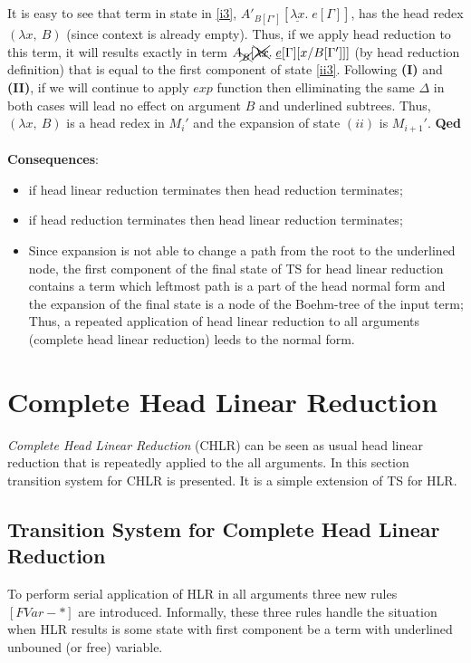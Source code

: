 \documentclass[a4paper, 10pt]{article}
\begin{document}
It is easy to see that term in state in \eqref{i3}, $A'_{B[\Gamma']}[\underline{\lambda x}.\; e[\Gamma]]$, has the head redex $(\lambda x,\ B)$ (since context is already empty). Thus, if we apply head reduction to this term, it will results exactly in term $A_{\xcancel{B}}[\xcancel{\lambda x}.\; \underline{e}[\Gamma][x/B[\Gamma']]]$ (by head reduction definition) that is equal to the first component of state \eqref{ii3}. Following \textbf{(I)} and \textbf{(II)}, if we will continue to apply $exp$ function then elliminating the same $\Delta$ in both cases will lead no effect on argument $B$ and underlined subtrees. Thus, $(\lambda x,\ B)$ is a head redex in $M_i'$ and the expansion of state $(ii)$ is $M_{i+1}'$. \hfill{\textbf{Qed}} \\ \\ 

\textbf{Consequences}:
\begin{itemize}
\item if head linear reduction terminates then head reduction terminates;
\item if head reduction terminates then head linear reduction terminates;
\item Since expansion is not able to change a path from the root to the underlined node,
  the first component of the final state of TS for head linear reduction
  contains a term which leftmost path is a part of the head normal form 
  and the expansion of the final state is a node of the Boehm-tree of the input term; \\
  Thus, a repeated application of head linear reduction to all arguments
  (complete head linear reduction) leeds to the normal form.
\end{itemize}


\newpage
\section{Complete Head Linear Reduction}
\emph{Complete Head Linear Reduction} (CHLR) can be seen as usual head linear reduction that is repeatedly
applied to the all arguments.
In this section transition system for CHLR is presented. It is a simple extension of TS for HLR.

\subsection{Transition System for Complete Head Linear Reduction}

To perform serial application of HLR in all arguments three new rules $[FVar-*]$ are introduced.
Informally, these three rules handle the situation when HLR results is some state with first component
be a term with underlined unbouned (or free) variable.
\end{document}

